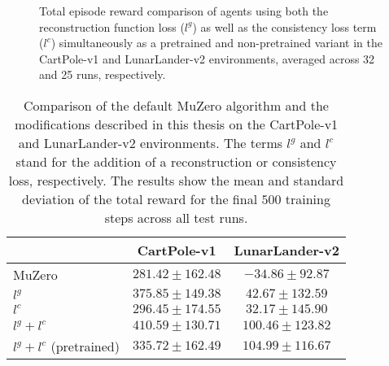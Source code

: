 \begin{figure}[H]
    \caption{Total episode reward comparison of agents using both the reconstruction function loss ($l^g$) as well as the consistency loss term ($l^c$) simultaneously as a pretrained and non-pretrained variant in the CartPole-v1 and LunarLander-v2 environments, averaged across 32 and 25 runs, respectively.}
    \label{fig:pretrained_results}
\end{figure}

\begin{table}[H]
    \centering
    \begin{tabular}{|l||c|c|}
        \hline
        & CartPole-v1 & LunarLander-v2 \\
        \hline \hline
        MuZero & $281.42 \pm 162.48$ & $-34.86 \pm 92.87$ \\
        \hline
        $l^g$ & $375.85 \pm 149.38$ & $42.67 \pm 132.59$\\
        \hline
        $l^c$ & $296.45 \pm 174.55$ & $32.17 \pm 145.90$ \\
        \hline
        $l^g + l^c$ & $\mathbf{410.59 \pm 130.71}$ & $100.46 \pm 123.82$ \\
        \hline
        $l^g + l^c$ (pretrained) & $335.72 \pm 162.49$ & $\mathbf{104.99 \pm 116.67}$ \\
        \hline
    \end{tabular}
    \caption{Comparison of the default MuZero algorithm and the modifications described in this thesis on the CartPole-v1 and LunarLander-v2 environments. The terms $l^g$ and $l^c$ stand for the addition of a reconstruction or consistency loss, respectively. The results show the mean and standard deviation of the total reward for the final $500$ training steps across all test runs.}
    \label{tab:results_table}
\end{table}